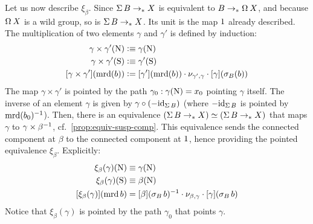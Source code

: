 \documentclass[english,a4paper]{lmcs}
\begin{document}
Let us now describe $\xi_\beta$. Since $\operatorname{\Sigma} B \to_\ast X$ is equivalent to $B \ptdto \loopspace\null X$, and because $\loopspace\null X$ is a wild group, so is $\operatorname{\Sigma} B \to_\ast X$. Its unit is the map $1$ already described. The multiplication of two elements $\gamma$ and $\gamma'$ is defined by induction:
\begin{equation}
  \begin{aligned}
    \gamma \times \gamma' (\mathrm{N}) &\vcentcolon\equiv \gamma(\mathrm{N}) \\
    \gamma \times \gamma' (\mathrm{S}) &\vcentcolon\equiv \gamma'(\mathrm{S}) \\
    \mathop{\left[{\gamma \times \gamma'}\right]} (\operatorname{\mathrm{mrd}} (b) ) &\vcentcolon=
    \mathop{\left[{\gamma'}\right]}(\operatorname{\mathrm{mrd}}(b)) \cdot \nu_{\gamma',\gamma} \cdot \mathop{\left[{\gamma}\right]}(\sigma_B(b))
  \end{aligned}
  \label{eq:wild-group-from-susp-product}
\end{equation}
The map $\gamma \times \gamma'$ is pointed by the path $\gamma_0: \gamma(\mathrm{N}) =
x_0$ pointing $\gamma$ itself.
The inverse of an element $\gamma$ is given by $\gamma \circ (-\mathord{\mathrm{id}}_{\operatorname{\Sigma} B})$
(where $-\mathord{\mathrm{id}}_{\operatorname{\Sigma} B}$ is pointed by $\operatorname{\mathrm{mrd}}(b_0)^{-1}$).  Then, there is an
equivalence $(\operatorname{\Sigma} B \to_\ast X) \simeq (\operatorname{\Sigma} B \to_\ast X)$ that maps $\gamma$ to
$\gamma \times \beta^{-1}$, cf.~\cref{prop:equiv-susp-comp}.
This equivalence sends the connected component at
$\beta$ to the connected component at $1$, hence providing the pointed
equivalence $\xi_\beta$. Explicitly:
\begin{equation}
  \begin{aligned}
    \xi_\beta(\gamma)(\mathrm{N}) &\equiv \gamma(\mathrm{N}) \\
    \xi_\beta(\gamma)(\mathrm{S}) &\equiv \beta(\mathrm{N}) \\
    \mathop{\left[{\xi_\beta(\gamma)}\right]}(\operatorname{\mathrm{mrd}} b)
    &= \mathop{\left[{\beta}\right]}(\sigma_B\,b)^{-1} \cdot
    \nu_{\beta,\gamma} \cdot
    \mathop{\left[{\gamma}\right]}(\sigma_B\,b)
  \end{aligned}
\end{equation}
Notice that $\xi_\beta(\gamma)$ is pointed by the path $\gamma_0$ that points
$\gamma$.
\end{document}
